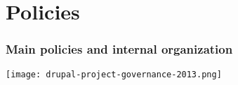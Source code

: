 \section{Policies}

% 
\begin{frame}[allowframebreaks]
\frametitle{Main policies and internal organization}

\texttt{[image: drupal-project-governance-2013.png]}

\end{frame}
